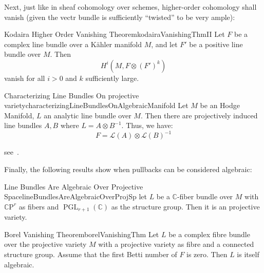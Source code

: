 \documentclass{book}
\newenvironment{Proof}[1][]
  {\begin{ProofTcb}[#1]}
  {\end{ProofTcb}}
\newcommand{\C}{{\mathbb{C}}}
\newcommand{\CL}{{\mathcal{L}}}
\newcommand{\CP}{{\mathbb{C}\mathrm{P}}}
\newcommand{\GL}{{\operatorname{GL}}}
\newcommand{\PGL}{{\operatorname{PGL}}}
\begin{document}
Next, just like in sheaf cohomology over schemes, higher-order cohomology shall vanish (given the vectr bundle
is sufficiently ``twisted'' to be very ample):

\begin{thm}{Kodaira Higher Order Vanishing Theorem}{kodairaVanishingThmII}
  Let $F$ be a complex line bundle over a K\"ahler manifold $M$, and let $F'$ be a positive line bundle over $M$.
  Then
  \[
    H^i(M, F\otimes (F')^k)
  \]
  vanish for all $i > 0$ and $k$ sufficiently large.
\end{thm}

\begin{Proof}
  \cite{voisinHodgeTheoryComplex2002}
\end{Proof}

\begin{thm}{Characterizing Line Bundles On projective variety}{characterizingLineBundlesOnAlgebraicManifold}
  Let $M$ be an Hodge Manifold, $L$ an analytic line bundle over $M$. Then there are projectively induced
  line bundles $A,B$ where $L = A\otimes B^{-1}$. Thus, we have:
  \[
    F = \CL(A)\otimes \CL(B)^{-1}
  \]
\end{thm}

\begin{Proof}
  see~\cite[p.141, thm~18.2.5]{hirzebruchTopologicalMethodsAlgebraic1995}.
\end{Proof}

Finally, the following results show when pullbacks can be considered algebraic:

\begin{thm}{Line Bundles Are Algebraic Over Projective Space}{lineBundlesAreAlgebraicOverProjSp}
  let $L$ be a $\C$-fiber bundle over $M$ with $\CP^r$ as fibers and $\PGL_{r+1}(\C)$ as the structure group.
  Then it is an projective variety.
\end{thm}

\begin{Proof}
\cite{deligneRelevementsModulop2etDecomposition1987}
\end{Proof}




\begin{thm}{Borel Vanishing Theorem}{borelVanishingThm}
  Let $L$ be a complex fibre bundle over the projective variety $M$ with a projective variety as fibre
  and a connected structure group. Assume that the first Betti number of $F$ is zero. Then $L$ is itself
  algebraic.
\end{thm}
\end{document}
